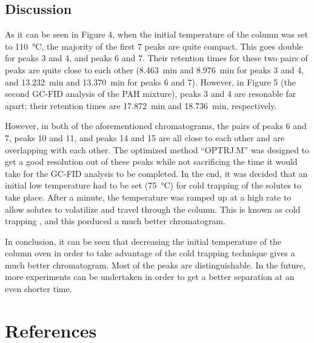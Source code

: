 \documentclass[a4paper, 12pt]{article}
\begin{document}
\subsection{Discussion}
As it can be seen in Figure 4, when the initial temperature of the column was set to \SI{110}{\degreeCelsius}, the majority of the first \num{7} peaks are quite compact. This goes double for peaks \num{3} and \num{4}, and peaks \num{6} and \num{7}. Their retention times for these two pairs of peaks are quite close to each other (\SI{8.463}{min} and \SI{8.976}{min} for peaks \num{3} and \num{4}, and \SI{13.232}{min} and \SI{13.370}{min} for peaks \num{6} and \num{7}). However, in Figure \num{5} (the second GC-FID analysis of the PAH mixture), peaks \num{3} and \num{4} are resonable far apart; their retention times are \SI{17.872}{min} and \SI{18.736}{min}, respectively.

However, in both of the aforementioned chromatograms, the pairs of peaks \num{6} and \num{7}, peaks \num{10} and \num{11}, and peaks \num{14} and \num{15} are all close to each other and are overlapping with each other. The optimized method ``OPTRJ.M'' was designed to get a good resolution out of these peaks while not sacrificing the time it would take for the GC-FID analysis to be completed. In the end, it was decided that an initial low temperature had to be set (\SI{75}{\degreeCelsius}) for cold trapping of the solutes to take place. After a minute, the temperature was ramped up at a high rate to allow solutes to volatilize and travel through the column. This is known as cold trapping \cite{harris_quantitative_2010}, and this porduced a much better chromatogram.

In conclusion, it can be seen that decreasing the initial temperature of the column oven in order to take advantage of the cold trapping technique gives a much better chromatogram. Most of the peaks are distinguishable. In the future, more experiments can be undertaken in order to get a better separation at an even shorter time.


\section{References}
\printbibliography

\end{document}
